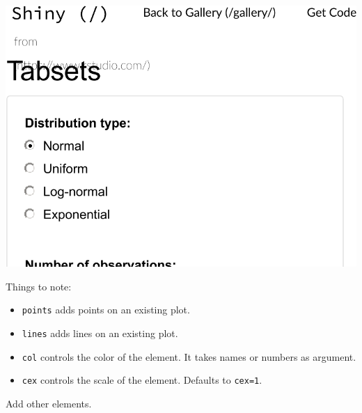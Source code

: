 \documentclass[]{book}
\providecommand{\tightlist}{%
  \setlength{\itemsep}{0pt}\setlength{\parskip}{0pt}}
\theoremstyle{definition}
\theoremstyle{definition}
\theoremstyle{definition}
\theoremstyle{remark}
\begin{document}
\includegraphics[width=0.5\linewidth]{Rcourse_files/figure-latex/unnamed-chunk-267-1}

Things to note:

\begin{itemize}
\tightlist
\item
  \texttt{points} adds points on an existing plot.
\item
  \texttt{lines} adds lines on an existing plot.
\item
  \texttt{col} controls the color of the element. It takes names or
  numbers as argument.
\item
  \texttt{cex} controls the scale of the element. Defaults to
  \texttt{cex=1}.
\end{itemize}

Add other elements.
\end{document}
